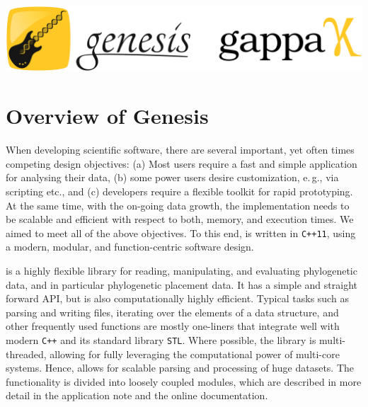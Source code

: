 \vspace*{1.5em}
\includegraphics[width=\linewidth]{pdf/logos.pdf}


\section{Overview of Genesis}
\label{ch:PipelineImplementation:sub:Genesis}


When developing scientific software, there are several important, yet often times competing design objectives:
(a) Most users require a fast and simple application for analysing their data,
(b) some power users desire customization, e.\,g., via scripting etc., and
(c) developers require a flexible toolkit for rapid prototyping.
At the same time, with the on-going data growth,
the implementation needs to be scalable and efficient with respect to both, memory, and execution times.
We aimed to meet all of the above objectives.
To this end,  is written in \texttt{C++11}, using a modern, modular, and function-centric software design.

 is a highly flexible library for reading, manipulating, and evaluating phylogenetic data,
and in particular phylogenetic placement data.
It has a simple and straight forward API, but is also computationally highly efficient.
Typical tasks such as parsing and writing files, iterating over the elements of a data structure,
and other frequently used functions are mostly one-liners
that integrate well with modern \texttt{C++} and its standard library \texttt{STL}.
Where possible, the library is multi-threaded,
allowing for fully leveraging the computational power of multi-core systems.
Hence,  allows for scalable parsing and processing of huge datasets.
The functionality is divided into loosely coupled modules,
which are described in more detail in the application note \cite{Czech2019-genesis-gappa} and the online documentation.

